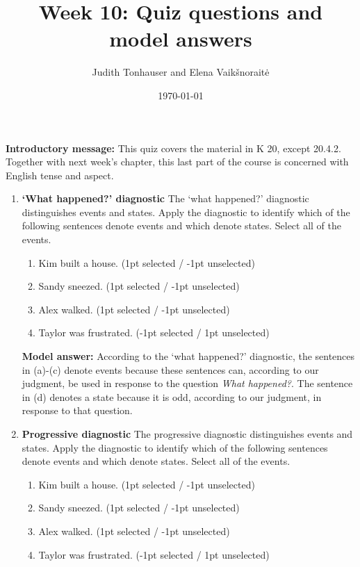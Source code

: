 \documentclass[a4,11pt]{article}
\title{Week 10: Quiz questions and model answers}
\author{Judith Tonhauser and Elena Vaik\v snorait\.{e} }
\date{\today}
\newcommand{\6}{\mbox{$[\hspace*{-.6mm}[$}}
\newcommand{\9}{\mbox{$]\hspace*{-.6mm}]$}}
\begin{document}
\maketitle

{\bf Introductory message:} This quiz covers the material in K 20, except 20.4.2. Together with next week's chapter, this last part of the course is concerned with English tense and aspect.

\begin{enumerate}[leftmargin = 12pt]

\item { \bf `What happened?' diagnostic} The `what happened?' diagnostic distinguishes events and states. Apply the diagnostic to identify which of the following sentences denote events and which denote states. Select all of the events.

\begin{enumerate}[noitemsep]
\item Kim built a house. (1pt selected /  -1pt unselected)
\item Sandy sneezed. (1pt selected /  -1pt unselected)
\item Alex walked. (1pt selected /  -1pt unselected)
\item Taylor was frustrated. (-1pt selected /  1pt unselected)
\end{enumerate}

{ \bf Model answer:} According to the `what happened?' diagnostic, the sentences in (a)-(c) denote events because these sentences can, according to our judgment, be used in response to the question {\em What happened?}. The sentence in (d) denotes a state because it is odd, according to our judgment, in response to that question.

\item {\bf Progressive diagnostic} The progressive diagnostic distinguishes events and states. Apply the diagnostic to identify which of the following sentences denote events and which denote states. Select all of the events.

\begin{enumerate}[noitemsep]
\item Kim built a house. (1pt selected /  -1pt unselected)
\item Sandy sneezed. (1pt selected /  -1pt unselected)
\item Alex walked. (1pt selected /  -1pt unselected)
\item Taylor was frustrated. (-1pt selected /  1pt unselected)
\end{enumerate}


\end{enumerate}
\end{document}
